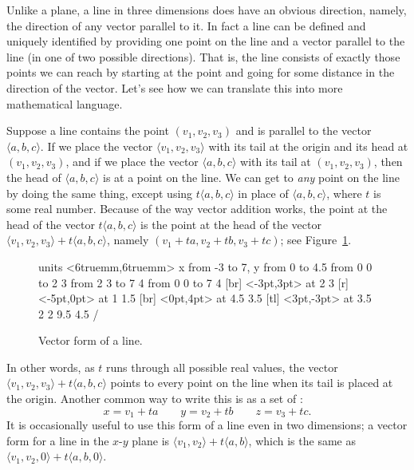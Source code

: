 Unlike a plane, a line in three dimensions does have an obvious
direction, namely, the direction of any vector parallel to it. In fact
a line can be defined and uniquely identified by providing one point
on the line and a vector parallel to the line (in one of two possible
directions). That is, the line consists of exactly those points we can
reach by starting at the point and going for some distance in the
direction of the vector. Let's see how we can translate this into more
mathematical language. 

Suppose a line contains the point $(v_1,v_2,v_3)$ and is parallel
to the vector $\langle a,b,c\rangle$. If we place the vector
$\langle v_1,v_2,v_3\rangle$ with its tail at the origin and its head
at $(v_1,v_2,v_3)$, and if we place the vector $\langle
a,b,c\rangle$ with its tail at $(v_1,v_2,v_3)$, then the head of
$\langle a,b,c\rangle$ is at a point on the line. We can get to
\emph{any} point on the line by doing the same thing, except using
$t\langle a,b,c\rangle$ in place of $\langle a,b,c\rangle$, where $t$
is some real number. Because of the way vector addition works, the
point at the head of the vector $t\langle a,b,c\rangle$ is the point
at the head of the vector $\langle v_1,v_2,v_3\rangle+t\langle
a,b,c\rangle$, namely $(v_1+ta,v_2+tb,v_3+tc)$; see
Figure~\ref{fig:vector line}.

\begin{figure}[H]
\centerline{
\vbox{\beginpicture
\normalgraphs
\setcoordinatesystem units <6truemm,6truemm>
\setplotarea x from -3 to 7, y from 0 to 4.5
\arrow <4pt> [0.35, 1] from 0 0 to 2 3
\arrow <4pt> [0.35, 1] from 2 3 to 7 4
\arrow <4pt> [0.35, 1] from 0 0 to 7 4
 [br] <-3pt,3pt> at 2 3
 [r] <-5pt,0pt> at 1 1.5
 [br] <0pt,4pt> at 4.5 3.5
 [tl]
  <3pt,-3pt> at 3.5 2
\setdashes
{} 2 9.5 4.5 /
\endpicture}}
\caption{Vector form of a line. \label{fig:vector line}}
\end{figure}

In other words, as $t$ runs through all possible real values, the
vector $\langle v_1,v_2,v_3\rangle+t\langle a,b,c\rangle$ points to
every point on the line when its tail is placed at the origin. Another
common way to write this is as a set of 
:
$$ x= v_1+ta\qquad y=v_2+tb \qquad z=v_3+tc.$$
It is occasionally useful to use this form of a line even in two
dimensions; a vector form for a line in the $x$-$y$ plane is
$\langle v_1,v_2\rangle+t\langle a,b\rangle$, which is the same as
$\langle v_1,v_2,0\rangle+t\langle a,b,0\rangle$.

